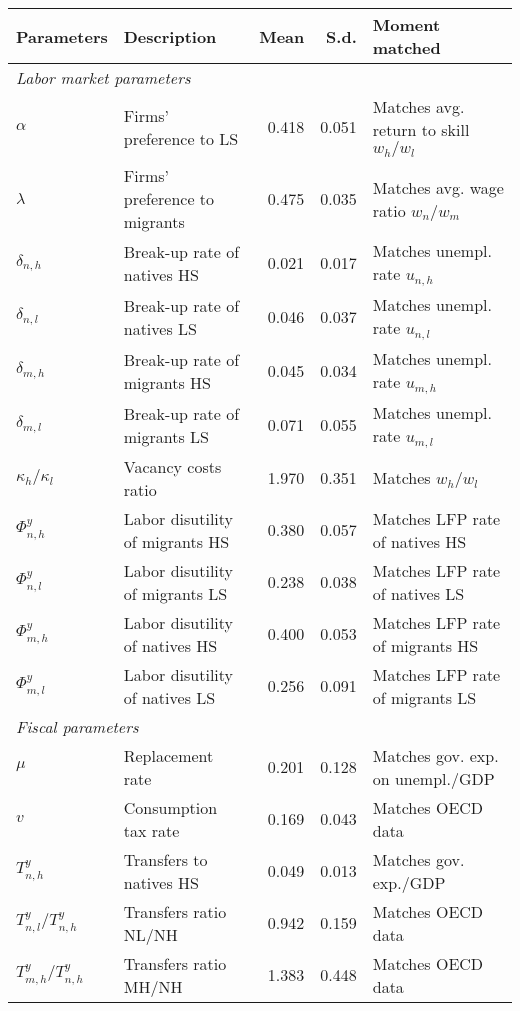 \begin{tabular}{llrrl}
\hline\hline
Parameters &        Description & Mean & S.d. &          Moment matched \\ \hline
\multicolumn{5}{l}{\textit{Labor market parameters}} \\ \hline
$\alpha$      &    Firms’ preference to LS &  0.418 &  0.051 &  Matches avg. return to skill $w_h / w_l$ \\
$\lambda$     &  Firms’ preference to migrants &  0.475 &  0.035 &   Matches avg. wage ratio $w_n / w_m$ \\
$\delta_{n,h}$    &  Break-up rate of natives HS &  0.021 &  0.017 &    Matches unempl. rate $u_{n,h}$ \\
$\delta_{n,l}$    &  Break-up rate of natives LS &  0.046 &  0.037 &    Matches unempl. rate $u_{n,l}$ \\
$\delta_{m,h}$    &   Break-up rate of migrants HS &  0.045 &  0.034 &    Matches unempl. rate $u_{m,h}$ \\
$\delta_{m,l}$    &   Break-up rate of migrants LS &  0.071 &  0.055 &    Matches unempl. rate $u_{m,l}$ \\
$\kappa_h / \kappa_l$ &      Vacancy costs ratio &  1.970 &  0.351 &         Matches $w_h / w_l$ \\
$\Phi_{n,h}^y$    &  Labor disutility of migrants HS &  0.380 &  0.057 &    Matches LFP rate of natives HS \\
$\Phi_{n,l}^y$    &  Labor disutility of migrants LS &  0.238 &  0.038 &    Matches LFP rate of natives LS \\
$\Phi_{m,h}^y$    & Labor disutility of natives HS &  0.400 &  0.053 &     Matches LFP rate of migrants HS \\
$\Phi_{m,l}^y$    & Labor disutility of natives LS &  0.256 &  0.091 &     Matches LFP rate of migrants LS \\
\hline
\multicolumn{5}{l}{\textit{Fiscal parameters}} \\ \hline
$\mu$       &       Replacement rate &  0.201 &  0.128 &    Matches gov. exp. on unempl./GDP \\
$v$       &     Consumption tax rate &  0.169 &  0.043 &         Matches OECD data \\
$T_{n,h}^y$     &    Transfers to natives HS &  0.049 &  0.013 &       Matches gov. exp./GDP \\
$T_{n,l}^y / T_{n,h}^y$ &    Transfers ratio NL/NH &  0.942 &  0.159 &         Matches OECD data \\
$T_{m,h}^y / T_{n,h}^y$ &    Transfers ratio MH/NH &  1.383 &  0.448 &         Matches OECD data \\

\end{tabular}
